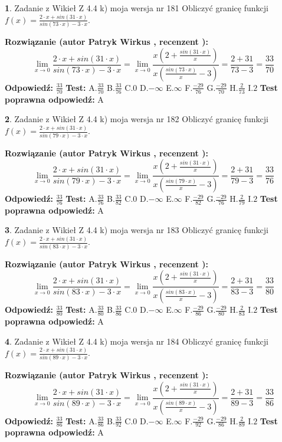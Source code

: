 \documentclass[12pt, a4paper]{article}
\theoremstyle{definition} %
\newtheorem{zad}{}
\newcommand{\zadStart}[1]{\begin{zad}#1\newline}
\newcommand{\zadStop}{\end{zad}}
\newcommand{\rozwStart}[2]{\noindent \textbf{Rozwiązanie (autor #1 , recenzent #2): }\newline}
\newcommand{\rozwStop}{\newline}
\newcommand{\odpStart}{\noindent \textbf{Odpowiedź:}\newline}
\newcommand{\odpStop}{\newline}
\newcommand{\testStart}{\noindent \textbf{Test:}\newline}
\newcommand{\testStop}{\newline}
\newcommand{\kluczStart}{\noindent \textbf{Test poprawna odpowiedź:}\newline}
\newcommand{\kluczStop}{\newline}
\begin{document}
\zadStart{Zadanie z Wikieł Z 4.4 k) moja wersja nr 181}
Obliczyć granicę funkcji $f(x)=\frac{2\cdot x +sin(31\cdot x)}{sin(73\cdot x) -3\cdot x}$.
\zadStop
\rozwStart{Patryk Wirkus}{}
$$\lim\limits_{x\to 0}\frac{2\cdot x +sin(31\cdot x)}{sin(73\cdot x) -3\cdot x}
=\lim\limits_{x\to 0}\frac{x(2+\frac{sin(31\cdot x)}{x})}{x(\frac{sin(73\cdot x)}{x}-3)}
=\frac{2+31}{73-3} = \frac{33}{70}$$
\rozwStop
\odpStart
$\frac{33}{70}$
\odpStop
\testStart
A.$\frac{33}{70}$
B.$\frac{33}{76}$
C.$0$
D.$-\infty$
E.$\infty$
F.$\frac{-29}{76}$
G.$\frac{-29}{70}$
H.$\frac{2}{73}$
I.$2$
\testStop
\kluczStart
A
\kluczStop



\zadStart{Zadanie z Wikieł Z 4.4 k) moja wersja nr 182}
Obliczyć granicę funkcji $f(x)=\frac{2\cdot x +sin(31\cdot x)}{sin(79\cdot x) -3\cdot x}$.
\zadStop
\rozwStart{Patryk Wirkus}{}
$$\lim\limits_{x\to 0}\frac{2\cdot x +sin(31\cdot x)}{sin(79\cdot x) -3\cdot x}
=\lim\limits_{x\to 0}\frac{x(2+\frac{sin(31\cdot x)}{x})}{x(\frac{sin(79\cdot x)}{x}-3)}
=\frac{2+31}{79-3} = \frac{33}{76}$$
\rozwStop
\odpStart
$\frac{33}{76}$
\odpStop
\testStart
A.$\frac{33}{76}$
B.$\frac{33}{82}$
C.$0$
D.$-\infty$
E.$\infty$
F.$\frac{-29}{82}$
G.$\frac{-29}{76}$
H.$\frac{2}{79}$
I.$2$
\testStop
\kluczStart
A
\kluczStop



\zadStart{Zadanie z Wikieł Z 4.4 k) moja wersja nr 183}
Obliczyć granicę funkcji $f(x)=\frac{2\cdot x +sin(31\cdot x)}{sin(83\cdot x) -3\cdot x}$.
\zadStop
\rozwStart{Patryk Wirkus}{}
$$\lim\limits_{x\to 0}\frac{2\cdot x +sin(31\cdot x)}{sin(83\cdot x) -3\cdot x}
=\lim\limits_{x\to 0}\frac{x(2+\frac{sin(31\cdot x)}{x})}{x(\frac{sin(83\cdot x)}{x}-3)}
=\frac{2+31}{83-3} = \frac{33}{80}$$
\rozwStop
\odpStart
$\frac{33}{80}$
\odpStop
\testStart
A.$\frac{33}{80}$
B.$\frac{33}{86}$
C.$0$
D.$-\infty$
E.$\infty$
F.$\frac{-29}{86}$
G.$\frac{-29}{80}$
H.$\frac{2}{83}$
I.$2$
\testStop
\kluczStart
A
\kluczStop



\zadStart{Zadanie z Wikieł Z 4.4 k) moja wersja nr 184}
Obliczyć granicę funkcji $f(x)=\frac{2\cdot x +sin(31\cdot x)}{sin(89\cdot x) -3\cdot x}$.
\zadStop
\rozwStart{Patryk Wirkus}{}
$$\lim\limits_{x\to 0}\frac{2\cdot x +sin(31\cdot x)}{sin(89\cdot x) -3\cdot x}
=\lim\limits_{x\to 0}\frac{x(2+\frac{sin(31\cdot x)}{x})}{x(\frac{sin(89\cdot x)}{x}-3)}
=\frac{2+31}{89-3} = \frac{33}{86}$$
\rozwStop
\odpStart
$\frac{33}{86}$
\odpStop
\testStart
A.$\frac{33}{86}$
B.$\frac{33}{92}$
C.$0$
D.$-\infty$
E.$\infty$
F.$\frac{-29}{92}$
G.$\frac{-29}{86}$
H.$\frac{2}{89}$
I.$2$
\testStop
\kluczStart
A
\kluczStop
\end{document}
